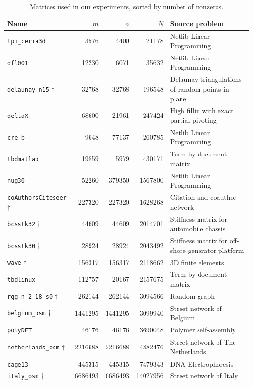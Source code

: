 \begin{table}[h]
	\centering
	\begin{tabular}{|l|r|r|r|p{7cm} |}
		\hline	
		\textbf{Name} & \textbf{$m$} & \textbf{$n$} & \textbf{$N$} & \textbf{Source problem} \\ \hline
		\verb|lpi_ceria3d| 									& 3576 		& 4400 		& 21178 & Netlib Linear Programming \\
		\verb|dfl001| 											& 12230 	& 6071 		& 35632 & Netlib Linear Programming \\ 
		\verb|delaunay_n15| $\dagger$ 			& 32768 	& 32768 	& 196548 & Delaunay triangulations of random points in plane \\ 
		\verb|deltaX| 											& 68600 	& 21961 	& 247424 & High fillin with exact partial pivoting \\
		\verb|cre_b| 												& 9648 		& 77137 	& 260785 & Netlib Linear Programming \\ 
		\verb|tbdmatlab| 										& 19859 	& 5979 		& 430171 & Term-by-document matrix \\ 
		\verb|nug30|												& 52260 	& 379350 	& 1567800 & Netlib Linear Programming \\ 
		\verb|coAuthorsCiteseer| $\dagger$ 	& 227320 	& 227320 	& 1628268 & Citation and coauthor network\\ 
		\verb|bcsstk32| $\dagger$ 					& 44609 	& 44609 	& 2014701 & Stiffness matrix for automobile chassis \\ 
		\verb|bcsstk30| $\dagger$						& 28924 	& 28924 	& 2043492 & Stiffness matrix for off-shore generator platform \\
		\verb|wave| 	$\dagger$							& 156317 	& 156317 	& 2118662 & 3D finite elements \\
		\verb|tbdlinux| 										& 112757 	& 20167 	& 2157675 & Term-by-document matrix \\
		\verb|rgg_n_2_18_s0| $\dagger$ 			& 262144 	& 262144 	& 3094566 & Random graph \\
		\verb|belgium_osm| $\dagger$				& 1441295 & 1441295 & 3099940 & Street network of Belgium\\
		\verb|polyDFT| 											& 46176 	& 46176 	& 3690048 & Polymer self-assembly \\ 
		\verb|netherlands_osm| $\dagger$		& 2216688 & 2216688 & 4882476 & Street network of The Netherlands \\
		\verb|cage13| 											& 445315 	& 445315 	& 7479343 & DNA Electrophoresis \\
		\verb|italy_osm| $\dagger$					& 6686493 & 6686493 & 14027956 & Street network of Italy\\
		\hline
	\end{tabular}
	\caption{Matrices used in our experiments, sorted by number of nonzeros.} \label{tab:matrices}
\end{table}

